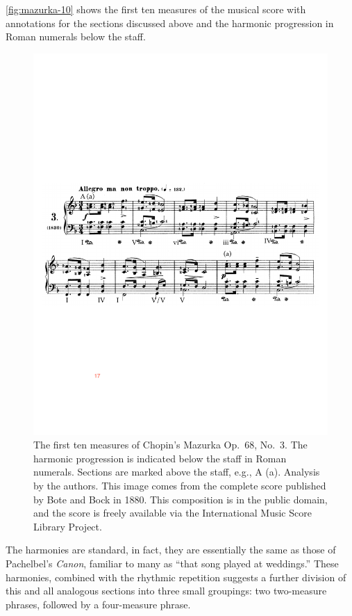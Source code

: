 \documentclass[aoas]{imsart}
\begin{document}
\autoref{fig:mazurka-10} shows the first ten measures of the musical
score with annotations for the sections discussed above and the
harmonic progression in Roman numerals below the staff. 
\begin{figure}[t]
  \centering
  \includegraphics[width=.9\textwidth]{mazurka-first-10}
  \caption{The first ten measures of Chopin's Mazurka Op.\ 68, No.\
    3. The harmonic progression is indicated below the staff in Roman
    numerals. Sections are marked above the staff, e.g., A
    (a). Analysis by the authors. This image comes from the complete
    score published by Bote and Bock in 1880. This composition is in
    the public domain, and the score is freely available via the
    International Music Score Library Project.}
  \label{fig:mazurka-10}
\end{figure}
The harmonies are standard, in fact, they are essentially the same as
those of Pachelbel's {\em Canon}, familiar to many as ``that song
played at weddings.'' These harmonies, combined with the
rhythmic repetition suggests a further division of this and
all analogous sections into three small groupings: two two-measure
phrases, followed by a four-measure phrase.
\end{document}
